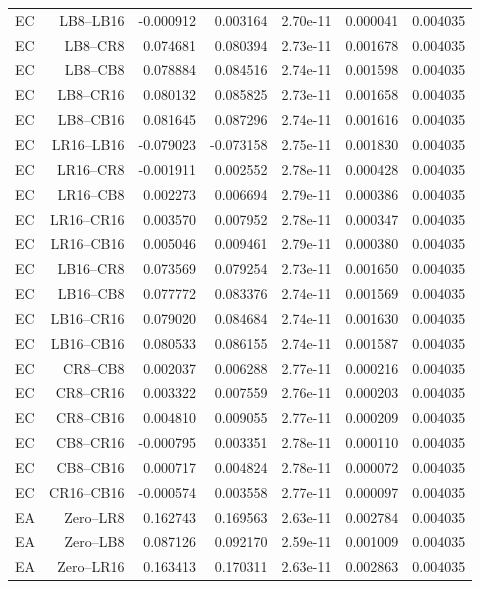 {\begin{longtable}{lrrrrrr}
EC & LB8--LB16 & -0.000912 & 0.003164 & 2.70e-11 & 0.000041 & 0.004035 \\
EC & LB8--CR8 & 0.074681 & 0.080394 & 2.73e-11 & 0.001678 & 0.004035 \\
EC & LB8--CB8 & 0.078884 & 0.084516 & 2.74e-11 & 0.001598 & 0.004035 \\
EC & LB8--CR16 & 0.080132 & 0.085825 & 2.73e-11 & 0.001658 & 0.004035 \\
EC & LB8--CB16 & 0.081645 & 0.087296 & 2.74e-11 & 0.001616 & 0.004035 \\
EC & LR16--LB16 & -0.079023 & -0.073158 & 2.75e-11 & 0.001830 & 0.004035 \\
EC & LR16--CR8 & -0.001911 & 0.002552 & 2.78e-11 & 0.000428 & 0.004035 \\
EC & LR16--CB8 & 0.002273 & 0.006694 & 2.79e-11 & 0.000386 & 0.004035 \\
EC & LR16--CR16 & 0.003570 & 0.007952 & 2.78e-11 & 0.000347 & 0.004035 \\
EC & LR16--CB16 & 0.005046 & 0.009461 & 2.79e-11 & 0.000380 & 0.004035 \\
EC & LB16--CR8 & 0.073569 & 0.079254 & 2.73e-11 & 0.001650 & 0.004035 \\
EC & LB16--CB8 & 0.077772 & 0.083376 & 2.74e-11 & 0.001569 & 0.004035 \\
EC & LB16--CR16 & 0.079020 & 0.084684 & 2.74e-11 & 0.001630 & 0.004035 \\
EC & LB16--CB16 & 0.080533 & 0.086155 & 2.74e-11 & 0.001587 & 0.004035 \\
EC & CR8--CB8 & 0.002037 & 0.006288 & 2.77e-11 & 0.000216 & 0.004035 \\
EC & CR8--CR16 & 0.003322 & 0.007559 & 2.76e-11 & 0.000203 & 0.004035 \\
EC & CR8--CB16 & 0.004810 & 0.009055 & 2.77e-11 & 0.000209 & 0.004035 \\
EC & CB8--CR16 & -0.000795 & 0.003351 & 2.78e-11 & 0.000110 & 0.004035 \\
EC & CB8--CB16 & 0.000717 & 0.004824 & 2.78e-11 & 0.000072 & 0.004035 \\
EC & CR16--CB16 & -0.000574 & 0.003558 & 2.77e-11 & 0.000097 & 0.004035 \\
EA & Zero--LR8 & 0.162743 & 0.169563 & 2.63e-11 & 0.002784 & 0.004035 \\
EA & Zero--LB8 & 0.087126 & 0.092170 & 2.59e-11 & 0.001009 & 0.004035 \\
EA & Zero--LR16 & 0.163413 & 0.170311 & 2.63e-11 & 0.002863 & 0.004035 \\

\end{longtable}}

